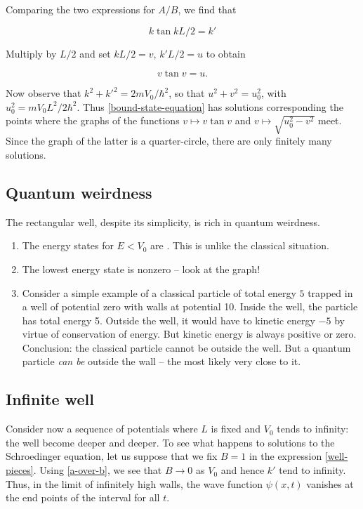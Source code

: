 Comparing the two expressions for $A/B$, we find that

\begin{equation}
  k \tan kL/2 = k'
\end{equation}

Multiply by $L/2$ and set $kL/2  = v$, $k'L/2 = u$ to obtain

\begin{equation}
  v \tan v = u.
\end{equation}

Now observe that $k^2 + k'^2 = 2mV_0/\hbar^2$, so that $u^2 + v^2 = u_0^2$, with $u_0^2 = mV_0L^2/2\hbar^2$.  Thus
\eqref{bound-state-equation} has solutions corresponding the points where the graphs of the functions $v \mapsto v\tan v$ and $v \mapsto \sqrt{u_0^2 -v^2}$ meet.  Since the graph of the latter is a quarter-circle, there are only finitely many solutions.

\subsection{Quantum weirdness}

The rectangular well, despite its simplicity, is rich in quantum weirdness.

\begin{enumerate}
\item The energy states for $E < V_0$ are .  This is unlike the classical situation.
%
\item The lowest energy state is nonzero -- look at the graph!
%
\item Consider a simple example of a classical particle of total energy $5$ trapped in a well of potential zero with walls at potential 10.  Inside the well, the particle has total energy 5.  Outside the well, it would have to kinetic energy $-5$ by virtue of conservation of energy.  But kinetic energy is always positive or zero. Conclusion: the classical particle cannot be outside the well.  But a quantum particle \emph{can be} outside the wall -- the most likely very close to it.
\end{enumerate}

\subsection{Infinite well}

Consider now a sequence of potentials where $L$ is fixed and $V_0$ tends to infinity: the well become deeper and deeper. To see what happens to solutions to the Schroedinger equation, let us suppose that we fix $B = 1$ in the expression \eqref{well-pieces}. Using \eqref{a-over-b}, we see that $B \longrightarrow 0$ as $V_0$ and hence $k'$ tend to infinity.  Thus, in the limit of infinitely high walls, the wave function $\psi(x,t)$ vanishes at the end points of the interval for all $t$.

